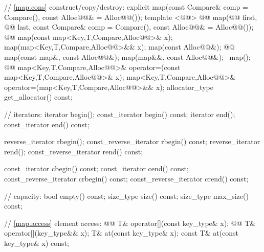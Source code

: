 \documentclass[american,twoside]{book}
\begin{document}
\begin{codeblock}
{{    // \ref{map.cons} construct/copy/destroy:
    explicit map(const Compare& comp = Compare(),
                 const Alloc@@& = Alloc@@());
    template <@@>
      @@
      map(@@ first, @@ last,
          const Compare& comp = Compare(), const Alloc@@& = Alloc@@());
    @@ 
      map(const map<Key,T,Compare,Alloc@@>& x);
    map(map<Key,T,Compare,Alloc@@>&& x);
    map(const Alloc@@&);
    @@ 
      map(const map&, const Alloc@@&);
    map(map&&, const Alloc@@&);
   ~map();
    @@
      map<Key,T,Compare,Alloc@@>& operator=(const map<Key,T,Compare,Alloc@@>& x);
    map<Key,T,Compare,Alloc@@>&
      operator=(map<Key,T,Compare,Alloc@@>&& x);
    allocator_type get_allocator() const;

    // iterators:
    iterator               begin();
    const_iterator         begin() const;
    iterator               end();
    const_iterator         end() const;

    reverse_iterator       rbegin();
    const_reverse_iterator rbegin() const;
    reverse_iterator       rend();
    const_reverse_iterator rend() const;

    const_iterator         cbegin() const;
    const_iterator         cend() const;
    const_reverse_iterator crbegin() const;
    const_reverse_iterator crend() const;

    // capacity:
    bool      empty() const;
    size_type size() const;
    size_type max_size() const;

    // \ref{map.access} element access:
    @@
      T& operator[](const key_type& x);
    @@
      T& operator[](key_type&& x);
    T&       at(const key_type& x);
    const T& at(const key_type& x) const;

}}
\end{codeblock}
\end{document}

